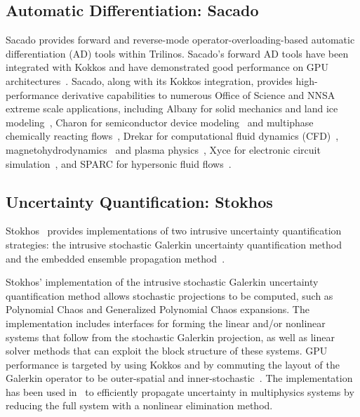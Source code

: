 \subsection{Automatic Differentiation: Sacado} \label{sec:sacado}

Sacado \cite{SacadoURL,phipps2012efficient,phipps2008large} provides forward and reverse-mode operator-overloading-based automatic differentiation (AD) tools within Trilinos.
Sacado's forward AD tools have been integrated with Kokkos and have demonstrated good performance on GPU architectures~\cite{phipps2022automatic}.
Sacado, along with its Kokkos integration, provides high-performance derivative capabilities to numerous Office of Science and NNSA extreme scale applications, including Albany for solid mechanics and land ice modeling~\cite{Salinger2016,MPASAlbany2018},
Charon for semiconductor device modeling~\cite{CharonUsersManual2020} and multiphase chemically reacting flows~\cite{Musson2009}, Drekar for computational fluid dynamics (CFD)~\cite{Sondak2021,Shadid2016}, magnetohydrodynamics~\cite{Shadid2016mhd} and
plasma physics~\cite{Crockatt2022,Miller2019}, Xyce for electronic circuit simulation~\cite{xyceTrilinos,xycePCE}, and SPARC for hypersonic fluid flows~\cite{SparcValidation}.

\subsection{Uncertainty Quantification: Stokhos}

Stokhos~\cite{phipps2015stokhos,Phipps2016,phipps2014exploring} provides implementations of two intrusive uncertainty quantification strategies:
the intrusive stochastic Galerkin uncertainty quantification method~\cite{ghanem1990polynomial,ghanem2003stochastic} and the embedded ensemble propagation method~\cite{phipps2017embedded}.

Stokhos' implementation of the intrusive stochastic Galerkin uncertainty quantification method allows stochastic projections to be computed, such as Polynomial Chaos and Generalized Polynomial Chaos expansions.
The implementation includes interfaces for forming the linear and/or nonlinear systems that follow from the stochastic Galerkin projection, as well as linear solver methods that can exploit the block structure of these systems.
GPU performance is targeted by using Kokkos and by commuting the layout of the Galerkin operator to be outer-spatial and inner-stochastic~\cite{phipps2014exploring}.
The implementation has been used in~\cite{constantine2014efficient} to efficiently propagate uncertainty in multiphysics systems by reducing the full system with a nonlinear elimination method.

